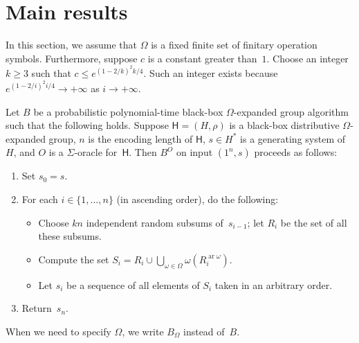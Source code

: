 \documentclass{jgcc}
\DeclareMathOperator{\ar}{ar}
\newcommand{\bb}{\mathsf}
\begin{document}
\section{Main results}
\label{s:mainres}

In this section, we assume that $\Omega$ is a fixed finite
set of finitary operation symbols. Furthermore, suppose $c$
is a constant greater than~$1$. Choose an integer $k\ge3$
such that $c\le e^{(1-2/k)^2k/4}$. Such an integer exists
because $e^{(1-2/i)^2i/4}\to+\infty$ as $i\to+\infty$.

Let $B$ be a probabilistic polynomial-time black-box
$\Omega$-expanded group algorithm such that the following
holds. Suppose $\bb H=(H,\rho)$ is a black-box distributive
$\Omega$-expanded group, $n$ is the encoding length of $\bb
H$, $s\in H^*$ is a generating system of $H$, and $O$ is a
$\Sigma$-oracle for~$\bb H$. Then $B^O$ on input $(1^n,s)$
proceeds as follows:
\begin{enumerate}
\item Set $s_0=s$.

\item For each $i\in\{1,\dots,n\}$ (in ascending order), do
the following:
\begin{itemize}
\item Choose $kn$ independent random subsums of~$s_{i-1}$;
let $R_i$ be the set of all these subsums.

\item Compute the set
$S_i=R_i\cup\bigcup_{\omega\in\Omega}\omega(R_i^{\ar\omega})$.

\item Let $s_i$ be a sequence of all elements of $S_i$ taken
in an arbitrary order.
\end{itemize}

\item Return~$s_n$.
\end{enumerate}
When we need to specify $\Omega$, we write $B_\Omega$
instead of~$B$.
\end{document}

